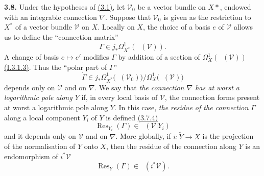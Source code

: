 \documentclass{report}
\newenvironment{rmenv}[1]
  {\phantomsection\par\medskip\noindent\textbf{#1.}\rmfamily}
  {\par\medskip}
\renewcommand{\cal}[1]{{\mathcal{#1}}}
\DeclareMathOperator{\shEnd}{\underline{End}}
\DeclareMathOperator{\Res}{Res}
\begin{document}
\begin{rmenv}{3.8}
\label{II.3.8}
  Under the hypotheses of \hyperref[II.3.1]{(3.1)}, let $\cal{V}_0$ be a vector bundle on $X*$, endowed with an integrable connection $\nabla$.
  Suppose that $\cal{V}_0$ is given as the restriction to $X^*$ of a vector bundle $\cal{V}$ on $X$.
  Locally on $X$, the choice of a basis $e$ of $\cal{V}$ allows us to define the ``connection matrix''
  \[
  \label{II.3.8.1}
    \Gamma \in j_*\Omega_{X^*}^1(\shEnd(\cal{V})).
  \tag{3.8.1}
  \]
  A change of basis $e\mapsto e'$ modifies $\Gamma$ by addition of a section of $\Omega_X^1(\shEnd(\cal{V}))$ \hyperref[I.3.1.3]{(I.3.1.3)}.
  Thus the ``polar part of $\Gamma$''
  \[
  \label{II.3.8.2}
    \dot{\Gamma} \in j_*\Omega_{X^*}^1\big(\shEnd(\cal{V}_0))\big/\Omega_X^1(\shEnd(\cal{V})\big)
  \tag{3.8.2}
  \]
  depends only on $\cal{V}$ and on $\nabla$.
  We say that \emph{the connection $\nabla$ has at worst a logarithmic pole along $Y$} if, in every local basis of $\cal{V}$, the connection forms present at worst a logarithmic pole along $Y$.
  In this case, \emph{the residue of the connection $\Gamma$} along a local component $Y_i$ of $Y$ is defined \hyperref[II.3.7.4]{(3.7.4)}
  \[
  \label{II.3.8.3}
    \Res_{Y_i}(\Gamma) \in \shEnd(\cal{V}|Y_i)
  \tag{3.8.3}
  \]
  and it depends only on $\cal{V}$ and on $\nabla$.
  More globally, if $i\colon\widetilde{Y}\to X$ is the projection of the normalisation of $Y$ onto $X$, then the residue of the connection along $Y$ is an endomorphism of $i^*\cal{V}$
  \[
  \label{II.3.8.4}
    \Res_Y(\Gamma) \in \shEnd(i^*\cal{V}).
  \tag{3.8.4}
  \]
\end{rmenv}
\end{document}
